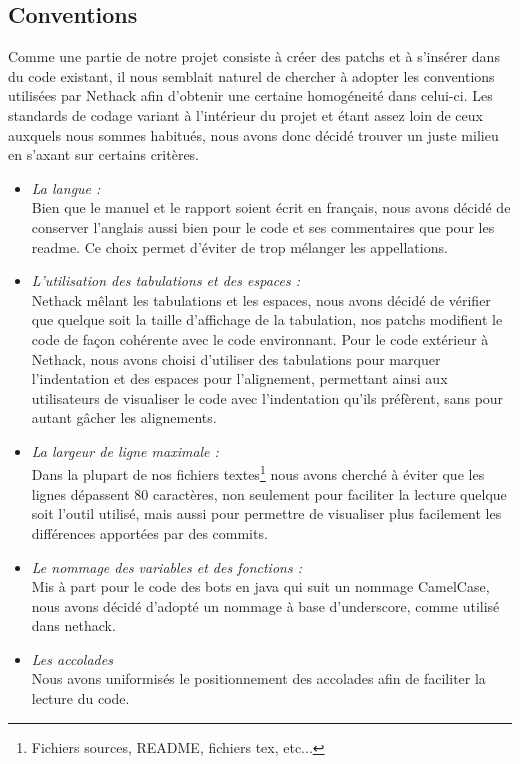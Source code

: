 \documentclass[a4paper,12pt]{article}
\begin{document}
\subsection{Conventions}
Comme une partie de notre projet consiste à créer des patchs et à s'insérer dans
du code existant, il nous semblait naturel de chercher à adopter les conventions
utilisées par Nethack afin d'obtenir une certaine homogéneité dans celui-ci.
Les standards de codage variant à l'intérieur du projet et étant assez loin de
ceux auxquels nous sommes habitués, nous avons donc décidé trouver un juste
milieu en s'axant sur certains critères.
\begin{itemize}
\item {\em La langue :}\\
  Bien que le manuel et le rapport soient écrit en français,
  nous avons décidé de conserver l'anglais aussi bien pour le code et ses
  commentaires que pour les readme. Ce choix permet d'éviter de trop mélanger
  les appellations.
\item {\em L'utilisation des tabulations et des espaces :}\\
  Nethack mêlant les tabulations et les espaces, nous avons décidé de vérifier
  que quelque soit la taille d'affichage de la tabulation, nos patchs modifient
  le code de façon cohérente avec le code environnant. Pour le code extérieur à
  Nethack, nous avons choisi d'utiliser des tabulations pour marquer
  l'indentation et des espaces pour l'alignement, permettant ainsi aux
  utilisateurs de visualiser le code avec l'indentation qu'ils préfèrent, sans
  pour autant gâcher les alignements.
\item {\em La largeur de ligne maximale :}\\
  Dans la plupart de nos fichiers textes\footnote{Fichiers sources, README,
    fichiers tex, etc...} nous avons cherché à éviter que les lignes dépassent
  80 caractères, non seulement pour faciliter la lecture quelque soit l'outil
  utilisé, mais aussi pour permettre de visualiser plus facilement les
  différences apportées par des commits.
\item {\em Le nommage des variables et des fonctions :}\\
  Mis à part pour le code des bots en java qui suit un nommage CamelCase,
  nous avons décidé d'adopté un nommage à base d'underscore, comme utilisé dans
  nethack.
\item {\em Les accolades}\\
  Nous avons uniformisés le positionnement des accolades afin de faciliter la
  lecture du code.
\end{itemize}
\end{document}
